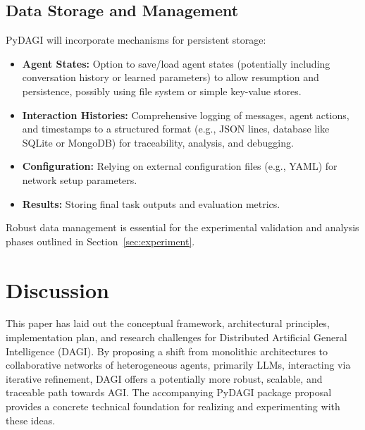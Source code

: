 \documentclass[12pt]{amsart}
\begin{document}
\subsection{Data Storage and Management}
PyDAGI will incorporate mechanisms for persistent storage:
\begin{itemize}[leftmargin=*]
    \item \textbf{Agent States:} Option to save/load agent states (potentially including conversation history or learned parameters) to allow resumption and persistence, possibly using file system or simple key-value stores.
    \item \textbf{Interaction Histories:} Comprehensive logging of messages, agent actions, and timestamps to a structured format (e.g., JSON lines, database like SQLite or MongoDB) for traceability, analysis, and debugging.
    \item \textbf{Configuration:} Relying on external configuration files (e.g., YAML) for network setup parameters.
    \item \textbf{Results:} Storing final task outputs and evaluation metrics.
\end{itemize}
Robust data management is essential for the experimental validation and analysis phases outlined in Section~\ref{sec:experiment}.

\section{Discussion}
\label{sec:discussion}
This paper has laid out the conceptual framework, architectural principles, implementation plan, and research challenges for Distributed Artificial General Intelligence (DAGI). By proposing a shift from monolithic architectures to collaborative networks of heterogeneous agents, primarily LLMs, interacting via iterative refinement, DAGI offers a potentially more robust, scalable, and traceable path towards AGI. The accompanying PyDAGI package proposal provides a concrete technical foundation for realizing and experimenting with these ideas.
\end{document}
